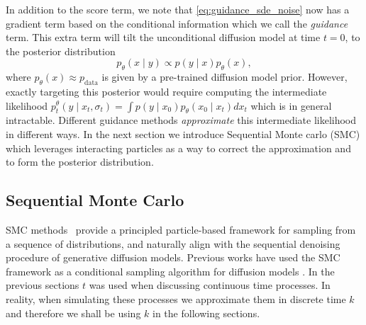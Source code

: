 In addition to the score term, we note that \eqref{eq:guidance_sde_noise} now has a gradient term based on the conditional information which we call the \emph{guidance} term. This extra term will tilt the unconditional diffusion model at time $t=0$, to the posterior distribution
\begin{equation}
    p_\theta(x \mid y) \propto p(y\mid x) p_{\theta}(x), 
    \label{eq:cond_posterior}
\end{equation} 
where $p_\theta(x)\approx p_{\text{data}}$ is given by a pre-trained diffusion model prior. However, exactly targeting this posterior would require computing the intermediate likelihood 
\(
    p_t^\theta(y \mid x_t, \sigma_t) = \int p(y \mid x_0) p_\theta(x_0 \mid x_t) dx_t
\)
which is in general intractable. Different guidance methods \cite{dou2024diffusion, zhao2025conditional, daras2024surveydiffusionmodelsinverse, chung2025diffusionmodelsinverseproblems} \emph{approximate} this intermediate likelihood in different ways. In the next section we introduce Sequential Monte carlo (SMC) which leverages interacting particles as a way to correct the approximation and to form the posterior distribution.  

\subsection{Sequential Monte Carlo}
SMC methods~\citep[e.g.,][]{chopin2020introduction,NaessethLS:2019a} provide a principled particle-based framework for sampling from a sequence of distributions, and naturally align with the sequential denoising procedure of generative diffusion models. Previous works have used the SMC framework as a conditional sampling algorithm for diffusion models \citep{wu2023-TDS, cardoso2024monte, stevens2025sequential, dou2024diffusion, pmlr-v267-ekstrom-kelvinius25b, zhao2025conditional}. In the previous sections $t$ was used when discussing continuous time processes. In reality, when simulating these processes we approximate them in discrete time $k$ and therefore we shall be using $k$ in the following sections. 

